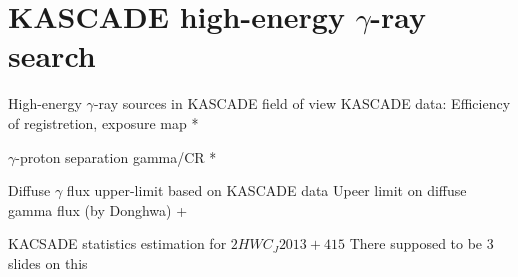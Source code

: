 
\section{KASCADE high-energy $\gamma$-ray search}

\begin{frame}{High-energy $\gamma$-ray sources in KASCADE field of view}
  KASCADE data: Efficiency of registretion, exposure map *
\end{frame}

\begin{frame}{$\gamma$-proton separation}
 gamma/CR *
\end{frame}

\begin{frame}{Diffuse $\gamma$ flux upper-limit based on KASCADE data}
  Upeer limit on diffuse gamma flux (by Donghwa) +
\end{frame}

\begin{frame}{KACSADE statistics estimation for $2HWC_J2013+415$}
There supposed to be 3 slides on this
\end{frame}